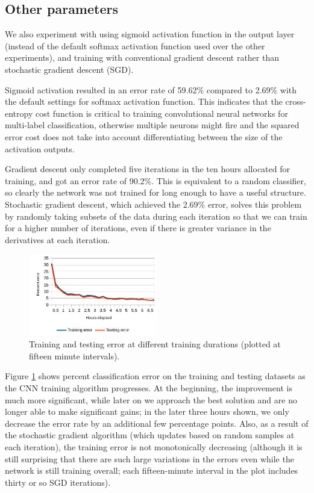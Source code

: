 \documentclass[10pt,twocolumn]{article}
\begin{document}
\subsection{Other parameters}

We also experiment with using sigmoid activation function in the output layer (instead of the default softmax activation function used over the other experiments), and training with conventional gradient descent rather than stochastic gradient descent (SGD).

Sigmoid activation resulted in an error rate of 59.62\% compared to 2.69\% with the default settings for softmax activation function. This indicates that the cross-entropy cost function is critical to training convolutional neural networks for multi-label classification, otherwise multiple neurons might fire and the squared error cost does not take into account differentiating between the size of the activation outputs.

Gradient descent only completed five iterations in the ten hours allocated for training, and got an error rate of 90.2\%. This is equivalent to a random classifier, so clearly the network was not trained for long enough to have a useful structure. Stochastic gradient descent, which achieved the 2.69\% error, solves this problem by randomly taking subsets of the data during each iteration so that we can train for a higher number of iterations, even if there is greater variance in the derivatives at each iteration.

\begin{figure}
\centering
\includegraphics[width = 0.5\textwidth]{figure/error_over_time}
\caption{Training and testing error at different training durations (plotted at fifteen minute intervals).}
\label{fig:error_over_time}
\end{figure}

Figure \ref{fig:error_over_time} shows percent classification error on the training and testing datasets as the CNN training algorithm progresses. At the beginning, the improvement is much more significant, while later on we approach the best solution and are no longer able to make significant gains; in the later three hours shown, we only decrease the error rate by an additional few percentage points. Also, as a result of the stochastic gradient algorithm (which updates based on random samples at each iteration), the training error is not monotonically decreasing (although it is still surprising that there are such large variations in the errors even while the network is still training overall; each fifteen-minute interval in the plot includes thirty or so SGD iterations).
\end{document}

